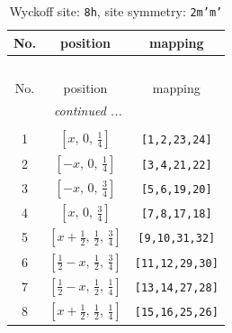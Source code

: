 \documentclass[fleqn,8pt]{jsarticle}
\begin{document}
\begin{longtable}{ccc}
\caption{Wyckoff site: {\tt 8h}, site symmetry: {\tt 2m'm'}}
 \\
 \hline \hline
No. & position & mapping \\ \hline \endfirsthead

\multicolumn{2}{l}{\tablename\ \thetable{}} \\
 \hline \hline
No. & position & mapping \\ \hline \endhead

 \hline \hline
\multicolumn{2}{r}{\footnotesize\it continued ...} \\ \endfoot

 \hline \hline
\multicolumn{2}{r}{} \\ \endlastfoot

1 & $\left[ x,\, 0,\, \frac{1}{4} \right]$ & {\tt [1,2,23,24]} \\ \hline
2 & $\left[ - x,\, 0,\, \frac{1}{4} \right]$ & {\tt [3,4,21,22]} \\ \hline
3 & $\left[ - x,\, 0,\, \frac{3}{4} \right]$ & {\tt [5,6,19,20]} \\ \hline
4 & $\left[ x,\, 0,\, \frac{3}{4} \right]$ & {\tt [7,8,17,18]} \\ \hline
5 & $\left[ x + \frac{1}{2},\, \frac{1}{2},\, \frac{3}{4} \right]$ & {\tt [9,10,31,32]} \\ \hline
6 & $\left[ \frac{1}{2} - x,\, \frac{1}{2},\, \frac{3}{4} \right]$ & {\tt [11,12,29,30]} \\ \hline
7 & $\left[ \frac{1}{2} - x,\, \frac{1}{2},\, \frac{1}{4} \right]$ & {\tt [13,14,27,28]} \\ \hline
8 & $\left[ x + \frac{1}{2},\, \frac{1}{2},\, \frac{1}{4} \right]$ & {\tt [15,16,25,26]} \\
\end{longtable}
\renewcommand{\arraystretch}{1.2}
\end{document}
